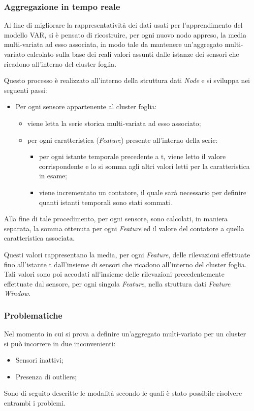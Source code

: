 \documentclass[12pt,a4paper,oneside,openright]{book}
\begin{document}
\subsubsection{Aggregazione in tempo reale}
Al fine di migliorare la rappresentatività dei dati usati per l'apprendimento del modello VAR, si è pensato di ricostruire, per ogni nuovo nodo appreso, la media multi-variata ad esso associata, in modo tale da mantenere un'aggregato multi-variato calcolato sulla base dei reali valori assunti dalle istanze dei sensori che ricadono all'interno del cluster foglia.

Questo processo è realizzato all'interno della struttura dati \textit{Node} e si sviluppa nei seguenti passi:
\begin{itemize}
\item Per ogni sensore appartenente al cluster foglia:
\begin{itemize}
\item viene letta la serie storica multi-variata ad esso associato;
\item per ogni caratteristica (\textit{Feature}) presente all'interno della serie:
\begin{itemize}
\item per ogni istante temporale precedente a t, viene letto il valore corrispondente e lo si somma agli altri valori letti per la caratteristica in esame;
\item viene incrementato un contatore, il quale sarà necessario per definire quanti istanti temporali sono stati sommati.
\end{itemize}
\end{itemize}
\end{itemize}

Alla fine di tale procedimento, per ogni sensore, sono calcolati, in maniera separata, la somma ottenuta per ogni \textit{Feature} ed il valore del contatore a quella caratteristica associata.

Questi valori rappresentano la media, per ogni \textit{Feature}, delle rilevazioni effettuate fino all'istante t dall'insieme di sensori che ricadono all'interno del cluster foglia.
Tali valori sono poi accodati all'insieme delle rilevazioni precedentemente effettuate dal sensore, per ogni singola \textit{Feature}, nella struttura dati \textit{Feature Window}. 

\subsubsection{Problematiche}
Nel momento in cui si prova a definire un'aggregato multi-variato per un cluster si può incorrere in due inconvenienti:
\begin{itemize}
\item Sensori inattivi;
\item Presenza di outliers;
\end{itemize}
Sono di seguito descritte le modalità secondo le quali è stato possibile risolvere entrambi i problemi.
\end{document}

